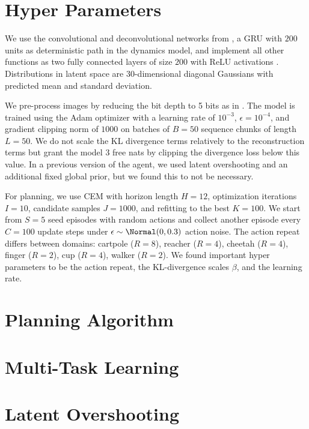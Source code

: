 \section{Hyper Parameters}
\label{sec:hparams}

We use the convolutional and deconvolutional networks from \citet{ha2018worldmodels}, a GRU \citep{cho2014gru} with $200$ units as deterministic path in the dynamics model, and implement all other functions as two fully connected layers of size $200$ with ReLU activations \citep{nair2010relu}. Distributions in latent space are $30$-dimensional diagonal Gaussians with predicted mean and standard deviation.

We pre-process images by reducing the bit depth to 5 bits as in \citet{kingma2018glow}. The model is trained using the Adam optimizer \citep{kingma2014adam} with a learning rate of $10^{-3}$, $\epsilon=10^{-4}$, and gradient clipping norm of $1000$ on batches of $B=50$ sequence chunks of length $L=50$. We do not scale the KL divergence terms relatively to the reconstruction terms but grant the model $3$ free nats by clipping the divergence loss below this value. In a previous version of the agent, we used latent overshooting and an additional fixed global prior, but we found this to not be necessary.

For planning, we use CEM with horizon length $H=12$, optimization iterations $I=10$, candidate samples $J=1000$, and refitting to the best $K=100$. We start from $S=5$ seed episodes with random actions and collect another episode every $C=100$ update steps under $\epsilon\sim\Normal(0,0.3)$ action noise. The action repeat differs between domains: cartpole ($R=8$), reacher ($R=4$), cheetah ($R=4$), finger ($R=2$), cup ($R=4$), walker ($R=2$). We found important hyper parameters to be the action repeat, the KL-divergence scales $\beta$, and the learning rate.

\section{Planning Algorithm}


\clearpage
\section{Multi-Task Learning}
\label{sec:exp_multi}



\clearpage
\section{Latent Overshooting}
\label{sec:exp_overshooting}


